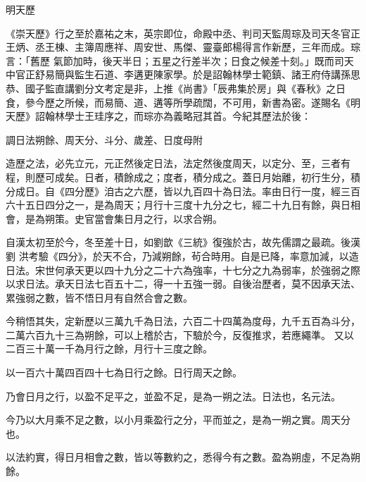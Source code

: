 
\begin{pinyinscope}

 明天歷



 《崇天歷》行之至於嘉祐之末，英宗即位，命殿中丞、判司天監周琮及司天冬官正王炳、丞王棟、主簿周應祥、周安世、馬傑、靈臺郎楊得言作新歷，三年而成。琮言：「舊歷
 氣節加時，後天半日；五星之行差半次；日食之候差十刻。」既而司天中官正舒易簡與監生石道、李遘更陳家學。於是詔翰林學士範鎮、諸王府侍講孫思恭、國子監直講劉分文考定是非，上推《尚書》「辰弗集於房」與《春秋》之日食，參今歷之所候，而易簡、道、遘等所學疏闊，不可用，新書為密。遂賜名《明天歷》詔翰林學士王珪序之，而琮亦為義略冠其首。今紀其歷法於後：



 調日法朔餘、周天分、斗分、歲差、日度母附



 造歷之法，必先立元，元正然後定日法，法定然後度周天，以定分、至，三者有程，則歷可成矣。日者，積餘成之；度者，積分成之。蓋日月始離，初行生分，積分成日。自《四分歷》洎古之六歷，皆以九百四十為日法。率由日行一度，經三百六十五日四分之一，是為周天；月行十三度十九分之七，經二十九日有餘，與日相會，是為朔策。史官當會集日月之行，以求合朔。



 自漢太初至於今，冬至差十日，如劉歆《三統》復強於古，故先儒謂之最疏。後漢劉
 洪考驗《四分》，於天不合，乃減朔餘，茍合時用。自是已降，率意加減，以造日法。宋世何承天更以四十九分之二十六為強率，十七分之九為弱率，於強弱之際以求日法。承天日法七百五十二，得一十五強一弱。自後治歷者，莫不因承天法、累強弱之數，皆不悟日月有自然合會之數。



 今稍悟其失，定新歷以三萬九千為日法，六百二十四萬為度母，九千五百為斗分，二萬六百九十三為朔餘，可以上稽於古，下驗於今，反復推求，若應繩準。
 又以二百三十萬一千為月行之餘，月行十三度之餘。



 以一百六十萬四百四十七為日行之餘。日行周天之餘。



 乃會日月之行，以盈不足平之，並盈不足，是為一朔之法。日法也，名元法。



 今乃以大月乘不足之數，以小月乘盈行之分，平而並之，是為一朔之實。周天分也。



 以法約實，得日月相會之數，皆以等數約之，悉得今有之數。盈為朔虛，不足為朔餘。




\end{pinyinscope}
